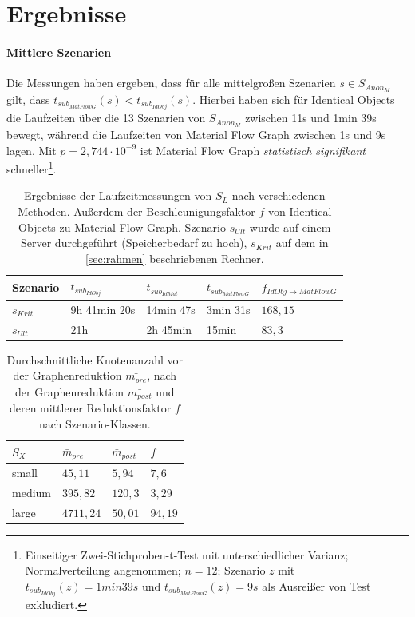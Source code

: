 \chapter{Ergebnisse} \label{sec:results}


\subsubsection{Mittlere Szenarien}



Die Messungen haben ergeben, dass für alle mittelgroßen Szenarien $s \in S_{Anon_M}$ gilt, dass $t_{sub_{MatFlowG}}(s) < t_{sub_{IdObj}}(s)$. Hierbei haben sich für Identical Objects die Laufzeiten über die 13 Szenarien von $S_{Anon_M}$ zwischen 11s und 1min 39s bewegt, während die Laufzeiten von Material Flow Graph zwischen 1s und 9s lagen. Mit $p=2,744 \cdot 10^{-9}$ ist Material Flow Graph \textit{statistisch signifikant} schneller\footnote{Einseitiger Zwei-Stichproben-t-Test mit unterschiedlicher Varianz; Normalverteilung angenommen; $n=12$; Szenario $z$ mit $t_{sub_{IdObj}}(z) = 1min 39s$ und $t_{sub_{MatFlowG}}(z) = 9s$ als Ausreißer von Test exkludiert.}. 

\begin{table}[ht]
	\centering
	\begin{tabular}{l|l|l|l|l}
		Szenario & $t_{sub_{IdObj}}$ & $t_{sub_{IdMat}}$& $t_{sub_{MatFlowG}}$ & $f_{IdObj \rightarrow MatFlowG}$ \\
		\midrule
		$s_{Krit}$ & 9h 41min 20s & 14min 47s & 3min 31s & $168,15$ \\
		$s_{Ult}$ & 21h & 2h 45min & 15min & $83,\bar{3}$ \\
		
	\end{tabular}
	\caption{Ergebnisse der Laufzeitmessungen von $S_L$ nach verschiedenen Methoden. Außerdem der Beschleunigungsfaktor $f$ von Identical Objects zu Material Flow Graph. Szenario $s_{Ult}$ wurde auf einem Server durchgeführt (Speicherbedarf zu hoch), $s_{Krit}$ auf dem in \autoref{sec:rahmen} beschriebenen Rechner.}
	\label{tab:large_scenarios}
\end{table}

\begin{table}[ht]
	\centering
	\begin{tabular}{l|l|l|l}
		$S_X$ & $\bar{m}_{pre}$ & $\bar{m}_{post}$& $f$ \\
		\midrule
		small & $45,11$ & $5,94$ & $7,6$ \\
		medium & $395,82$ & $120,3$ & $3,29$ \\
		large & $4711,24$ & $50,01$ & $94,19$ \\
	\end{tabular}
	\caption{Durchschnittliche Knotenanzahl vor der Graphenreduktion $\bar{m_{pre}}$, nach der Graphenreduktion $\bar{m_{post}}$ und deren mittlerer Reduktionsfaktor $f$ nach Szenario-Klassen.}
	\label{tab:scenarios_node_nb}
\end{table}

